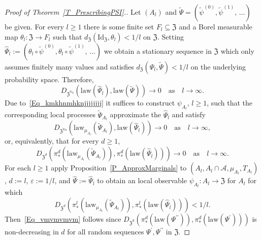 \documentclass[10pt]{amsart}
\theoremstyle{definition}\newtheorem{defi}[theo]{Definition}\newtheorem{rema}[theo]{Remark}\newtheorem{exam}[theo]{Example}\newtheorem{exem}[theo]{Example}\newtheorem{nota}[theo]{Notation}
\newcommand{\clA}{\mathcal{A}}
\newcommand{\law}{\mathrm{law}}
\newcommand{\rmId}{\mathrm{Id}}
\newcommand{\frkZ}{\mathfrak{Z}}
\newcommand{\bbN}{\mathbb{N}}
\begin{document}
\begin{proof}[{Proof of Theorem~\ref{T_PrescribingPSI}.}]
Let $(A_{l})$ and $\widetilde{\Psi}=(\widetilde{\psi}^{(0)},\widetilde{\psi}^{(1)},\,\ldots)$ be given. For every $l\geq1$ there is some finite set $F_{l}\subseteq
\frkZ$ and a Borel measurable map $\theta_{l}:\frkZ\rightarrow F_{l}$ such that $d_{\frkZ}(\rmId_{\frkZ},\theta_{l})<1/l$ on $\frkZ$. Setting $\widehat{\Psi}_{l}:=(\theta_{l}\circ
\widetilde{\psi}^{(0)},\theta_{l}\circ\widetilde{\psi}^{(1)},\,\ldots)$ we obtain a stationary sequence in $\frkZ$ which only assumes finitely many values and satisfies $d_{\frkZ}(\widehat{\Psi}_{l},\widetilde {\Psi})<1/l$ on the underlying probability space. Therefore,
\begin{equation}\label{Eq_kmkhnmhknjjjjjjjj}
D_{\frkZ^{\bbN_{0}}}\left(\law\left(\widehat{\Psi}_{l}\right),\law\left(\widetilde{\Psi}\right)\right)\longrightarrow0 \quad \text{as}\quad l\rightarrow\infty. 
\end{equation}
Due to~\eqref{Eq_kmkhnmhknjjjjjjjj} it suffices to construct $\psi_{A_{l}}$, $l\geq1$, such that the corresponding local processes $\widetilde{\Psi} _{A_{l}}$ approximate the $\widehat{\Psi}_{l}$ and satisfy
\begin{equation}
D_{\frkZ^{\bbN_{0}}}\left(\law_{\mu_{A_{l}}}\left(\widetilde{\Psi }_{A_{l}}\right),\law\left(\widehat{\Psi}_{l}\right)\right)\longrightarrow0\quad \text{as}\quad l\rightarrow\infty,
\end{equation}
or, equivalently, that for every $d\geq1$,
\begin{equation}\label{Eq_vmvmvmvm}
D_{\frkZ^{d}}(\pi_{\ast}^{d}(\law_{\mu_{A_{l}}}(\widetilde {\Psi}_{A_{l}})),\pi_{\ast}^{d}(\law(\widehat{\Psi}_{l})))\longrightarrow0\quad \text{as}\quad l\rightarrow\infty.
\end{equation}
For each $l\geq1$ apply Proposition~\ref{P_ApproxMarginals} to $(A_{l},A_{l}\cap\clA,\mu_{A_{l}},T_{A_{l}})$, $d:=l$, $\varepsilon:=1/l$, and $\widehat{\Psi}:=\widehat{\Psi}_{l}$ to obtain an local observable $\psi_{A_{l}}:A_{l}\rightarrow\frkZ$ for $A_{l}$ for which
\begin{equation}
D_{\frkZ^{d}}\left(\pi_{\ast}^{l}\left(\law_{\mu_{A_{l}}}\left(\widetilde {\Psi}_{A_{l}}\right)\right),\pi_{\ast}^{l}\left(\law\left(\widehat{\Psi}_{l}\right)\right)\right)<1/l.
\end{equation}
Then~\eqref{Eq_vmvmvmvm} follows since $D_{\frkZ^{d}}(\pi_{\ast} ^{d}(\law(\Psi^{\prime\prime})),\pi_{\ast}^{d}(\law (\Psi^{\prime})))$ is non-decreasing in $d$ for all random sequences $\Psi^{\prime},\Psi^{\prime\prime}$ in $\frkZ$.
\end{proof}
\end{document}
